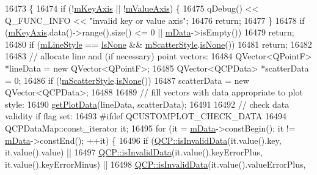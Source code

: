 \begin{DoxyCode}
16473                                        \{
16474   \textcolor{keywordflow}{if} (!\hyperlink{class_q_c_p_abstract_plottable_a426f42e254d0f8ce5436a868c61a6827}{mKeyAxis} || !\hyperlink{class_q_c_p_abstract_plottable_a2901452ca4aea911a1827717934a4bda}{mValueAxis}) \{
16475     qDebug() << Q\_FUNC\_INFO << \textcolor{stringliteral}{"invalid key or value axis"};
16476     \textcolor{keywordflow}{return};
16477   \}
16478   \textcolor{keywordflow}{if} (\hyperlink{class_q_c_p_abstract_plottable_a426f42e254d0f8ce5436a868c61a6827}{mKeyAxis}.data()->range().size() <= 0 || \hyperlink{class_q_c_p_graph_a8457c840f69a0ac49f61d30a509c5d08}{mData}->isEmpty())
16479     \textcolor{keywordflow}{return};
16480   \textcolor{keywordflow}{if} (\hyperlink{class_q_c_p_graph_a8604fd98402035a63375849f7341ee25}{mLineStyle} == \hyperlink{class_q_c_p_graph_ad60175cd9b5cac937c5ee685c32c0859aea9591b933733cc7b20786b71e60fa04}{lsNone} && \hyperlink{class_q_c_p_graph_a4aa36241f166ccd1f75fc8f24e4a3247}{mScatterStyle}.\hyperlink{class_q_c_p_scatter_style_aa3861281108d0adbeb291c820ea3925c}{isNone}())
16481     \textcolor{keywordflow}{return};
16482 
16483   \textcolor{comment}{// allocate line and (if necessary) point vectors:}
16484   QVector<QPointF> *lineData = \textcolor{keyword}{new} QVector<QPointF>;
16485   QVector<QCPData> *scatterData = 0;
16486   \textcolor{keywordflow}{if} (!\hyperlink{class_q_c_p_graph_a4aa36241f166ccd1f75fc8f24e4a3247}{mScatterStyle}.\hyperlink{class_q_c_p_scatter_style_aa3861281108d0adbeb291c820ea3925c}{isNone}())
16487     scatterData = \textcolor{keyword}{new} QVector<QCPData>;
16488 
16489   \textcolor{comment}{// fill vectors with data appropriate to plot style:}
16490   \hyperlink{class_q_c_p_graph_a466c661e015188971c862031af946693}{getPlotData}(lineData, scatterData);
16491 
16492 \textcolor{comment}{// check data validity if flag set:}
16493 \textcolor{preprocessor}{#ifdef QCUSTOMPLOT\_CHECK\_DATA}
16494   QCPDataMap::const\_iterator it;
16495   \textcolor{keywordflow}{for} (it = \hyperlink{class_q_c_p_graph_a8457c840f69a0ac49f61d30a509c5d08}{mData}->constBegin(); it != \hyperlink{class_q_c_p_graph_a8457c840f69a0ac49f61d30a509c5d08}{mData}->constEnd(); ++it) \{
16496     \textcolor{keywordflow}{if} (\hyperlink{namespace_q_c_p_a07ab701c05329089f933b9cae2638a63}{QCP::isInvalidData}(it.value().key, it.value().value) ||
16497         \hyperlink{namespace_q_c_p_a07ab701c05329089f933b9cae2638a63}{QCP::isInvalidData}(it.value().keyErrorPlus, it.value().keyErrorMinus) ||
16498         \hyperlink{namespace_q_c_p_a07ab701c05329089f933b9cae2638a63}{QCP::isInvalidData}(it.value().valueErrorPlus,

\end{DoxyCode}
